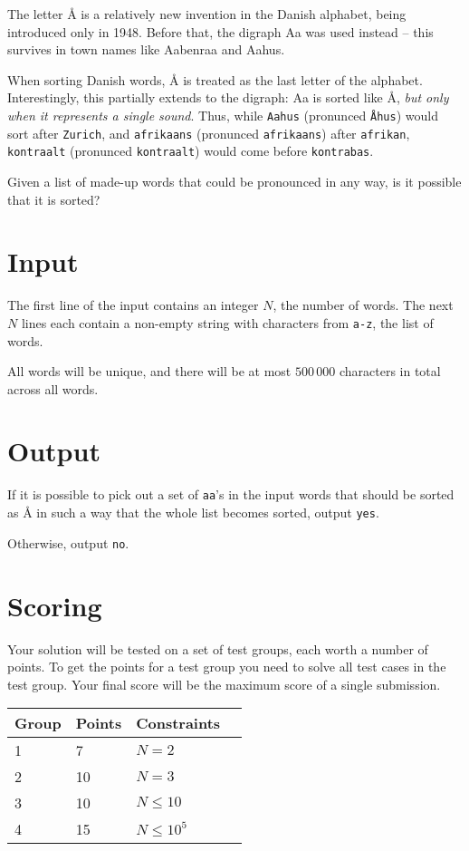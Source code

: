 The letter Å is a relatively new invention in the Danish alphabet, being introduced only in 1948.
Before that, the digraph Aa was used instead -- this survives in town names like Aabenraa and Aahus.

When sorting Danish words, Å is treated as the last letter of the alphabet.
Interestingly, this partially extends to the digraph: Aa is sorted like Å,
\emph{but only when it represents a single sound}.
Thus, while \texttt{Aahus} (pronunced \texttt{Åhus}) would sort after \texttt{Zurich},
and \texttt{afrikaans} (pronunced \texttt{afrikaans}) after \texttt{afrikan},
\texttt{kontraalt} (pronunced \texttt{kontraalt}) would come before \texttt{kontrabas}.

Given a list of made-up words that could be pronounced in any way, is it possible that it is sorted?

\section*{Input}
The first line of the input contains an integer $N$, the number of words.
The next $N$ lines each contain a non-empty string with characters from \texttt{a-z}, the list of words.

All words will be unique, and there will be at most $500\,000$ characters in total across all words.

\section*{Output}
If it is possible to pick out a set of \texttt{aa}'s in the input words that
should be sorted as Å in such a way that the whole list becomes sorted, output \texttt{yes}.

Otherwise, output \texttt{no}.

\section*{Scoring}
Your solution will be tested on a set of test groups, each worth a number of points.
To get the points for a test group you need to solve all test cases in the test group.
Your final score will be the maximum score of a single submission.

\noindent
\begin{tabular}{| l | l | l | l |}
\hline
Group & Points & Constraints \\ \hline
1     & 7      & $N = 2$ \\ \hline
2     & 10     & $N = 3$ \\ \hline
3     & 10     & $N \le 10$ \\ \hline
4     & 15     & $N \le 10^5$ \\ \hline
\end{tabular}

